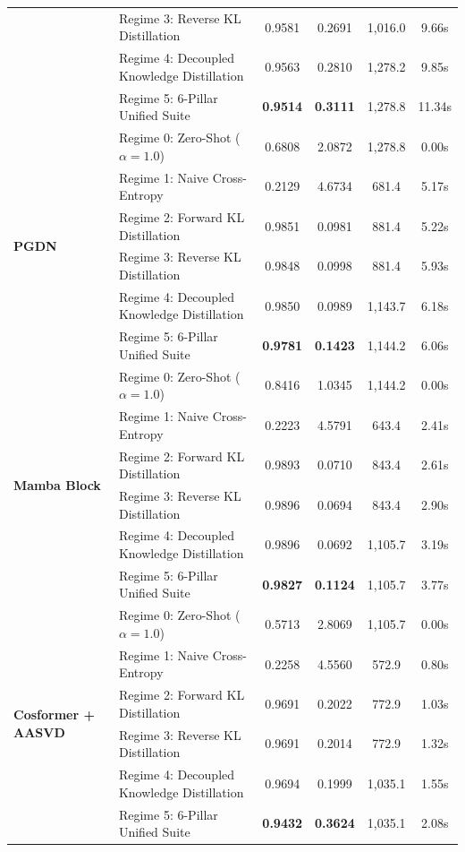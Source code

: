 \begin{table}[t]
\begin{tabular}{llcccc}
 & Regime 3: Reverse KL Distillation & 0.9581 & 0.2691 & 1,016.0 & 9.66s \\
 & Regime 4: Decoupled Knowledge Distillation & 0.9563 & 0.2810 & 1,278.2 & 9.85s \\
 & Regime 5: 6-Pillar Unified Suite & \textbf{0.9514} & \textbf{0.3111} & 1,278.8 & 11.34s \\
\midrule
\multirow{6}{*}{\textbf{PGDN}} & Regime 0: Zero-Shot ($\alpha=1.0$) & 0.6808 & 2.0872 & 1,278.8 & 0.00s \\
 & Regime 1: Naive Cross-Entropy & 0.2129 & 4.6734 & 681.4 & 5.17s \\
 & Regime 2: Forward KL Distillation & 0.9851 & 0.0981 & 881.4 & 5.22s \\
 & Regime 3: Reverse KL Distillation & 0.9848 & 0.0998 & 881.4 & 5.93s \\
 & Regime 4: Decoupled Knowledge Distillation & 0.9850 & 0.0989 & 1,143.7 & 6.18s \\
 & Regime 5: 6-Pillar Unified Suite & \textbf{0.9781} & \textbf{0.1423} & 1,144.2 & 6.06s \\
\midrule
\multirow{6}{*}{\textbf{Mamba Block}} & Regime 0: Zero-Shot ($\alpha=1.0$) & 0.8416 & 1.0345 & 1,144.2 & 0.00s \\
 & Regime 1: Naive Cross-Entropy & 0.2223 & 4.5791 & 643.4 & 2.41s \\
 & Regime 2: Forward KL Distillation & 0.9893 & 0.0710 & 843.4 & 2.61s \\
 & Regime 3: Reverse KL Distillation & 0.9896 & 0.0694 & 843.4 & 2.90s \\
 & Regime 4: Decoupled Knowledge Distillation & 0.9896 & 0.0692 & 1,105.7 & 3.19s \\
 & Regime 5: 6-Pillar Unified Suite & \textbf{0.9827} & \textbf{0.1124} & 1,105.7 & 3.77s \\
\midrule
\multirow{6}{*}{\textbf{Cosformer + AASVD}} & Regime 0: Zero-Shot ($\alpha=1.0$) & 0.5713 & 2.8069 & 1,105.7 & 0.00s \\
 & Regime 1: Naive Cross-Entropy & 0.2258 & 4.5560 & 572.9 & 0.80s \\
 & Regime 2: Forward KL Distillation & 0.9691 & 0.2022 & 772.9 & 1.03s \\
 & Regime 3: Reverse KL Distillation & 0.9691 & 0.2014 & 772.9 & 1.32s \\
 & Regime 4: Decoupled Knowledge Distillation & 0.9694 & 0.1999 & 1,035.1 & 1.55s \\
 & Regime 5: 6-Pillar Unified Suite & \textbf{0.9432} & \textbf{0.3624} & 1,035.1 & 2.08s \\
\bottomrule
\end{tabular}
\end{table}
